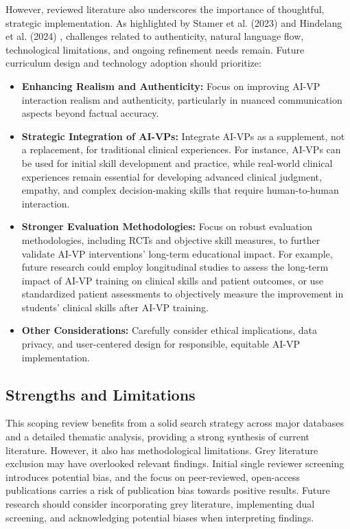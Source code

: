 However, reviewed literature also underscores the importance of thoughtful, strategic implementation. As highlighted by Stamer et al. (2023) \cite{scoping2023} and Hindelang et al. (2024) \cite{systematic2024}, challenges related to authenticity, natural language flow, technological limitations, and ongoing refinement needs remain. Future curriculum design and technology adoption should prioritize:

\begin{itemize}
    \item   \textbf{Enhancing Realism and Authenticity:} Focus on improving AI-VP interaction realism and authenticity, particularly in nuanced communication aspects beyond factual accuracy.
    \item   \textbf{Strategic Integration of AI-VPs:} Integrate AI-VPs as a supplement, not a replacement, for traditional clinical experiences. For instance, AI-VPs can be used for initial skill development and practice, while real-world clinical experiences remain essential for developing advanced clinical judgment, empathy, and complex decision-making skills that require human-to-human interaction.
    \item   \textbf{Stronger Evaluation Methodologies:} Focus on robust evaluation methodologies, including RCTs and objective skill measures, to further validate AI-VP interventions' long-term educational impact. For example, future research could employ longitudinal studies to assess the long-term impact of AI-VP training on clinical skills and patient outcomes, or use standardized patient assessments to objectively measure the improvement in students' clinical skills after AI-VP training.
    \item   \textbf{Other Considerations:} Carefully consider ethical implications, data privacy, and user-centered design for responsible, equitable AI-VP implementation.
\end{itemize}

\subsection*{\textbf{Strengths and Limitations}}

This scoping review benefits from a solid search strategy across major databases and a detailed thematic analysis, providing a strong synthesis of current literature. However, it also has methodological limitations. Grey literature exclusion may have overlooked relevant findings. Initial single reviewer screening introduces potential bias, and the focus on peer-reviewed, open-access publications carries a risk of publication bias towards positive results. Future research should consider incorporating grey literature, implementing dual screening, and acknowledging potential biases when interpreting findings.


